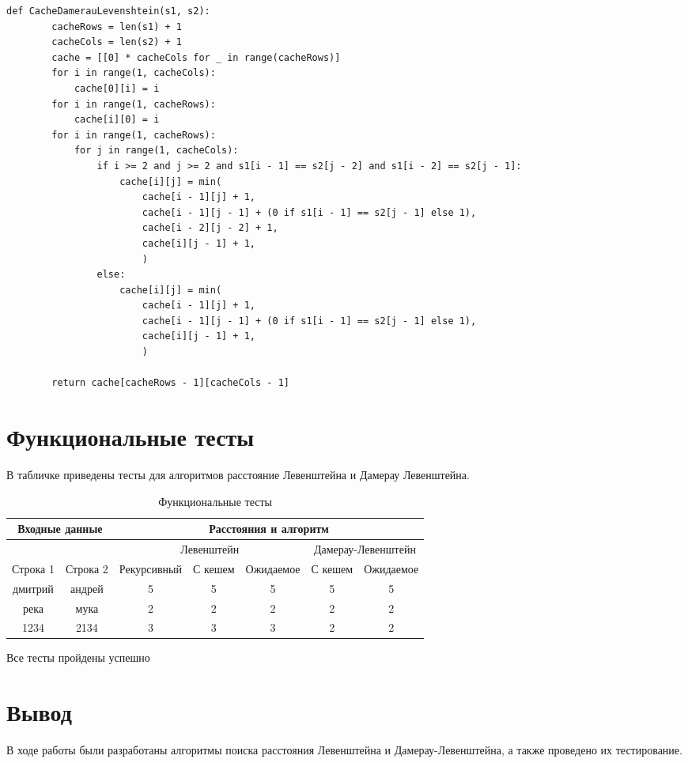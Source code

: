 \begin{lstlisting}[label=cache-damerau-levenshtein,caption={Итерационный алгоритм нахождения расстояния Дамерау-Левенштейна с кешэм}]
	def CacheDamerauLevenshtein(s1, s2):
		cacheRows = len(s1) + 1
		cacheCols = len(s2) + 1
		cache = [[0] * cacheCols for _ in range(cacheRows)]
		for i in range(1, cacheCols):
			cache[0][i] = i
		for i in range(1, cacheRows):
			cache[i][0] = i
		for i in range(1, cacheRows):
			for j in range(1, cacheCols):
				if i >= 2 and j >= 2 and s1[i - 1] == s2[j - 2] and s1[i - 2] == s2[j - 1]:
					cache[i][j] = min(
						cache[i - 1][j] + 1,
						cache[i - 1][j - 1] + (0 if s1[i - 1] == s2[j - 1] else 1),
						cache[i - 2][j - 2] + 1,
						cache[i][j - 1] + 1,
						)
				else:
					cache[i][j] = min(
						cache[i - 1][j] + 1,
						cache[i - 1][j - 1] + (0 if s1[i - 1] == s2[j - 1] else 1),
						cache[i][j - 1] + 1,
						)
		
		return cache[cacheRows - 1][cacheCols - 1]
\end{lstlisting}

\section{Функциональные тесты}

В табличке приведены тесты для алгоритмов расстояние Левенштейна и Дамерау Левенштейна.

\begin{table}[ht]
	\small
	\begin{center}
		\begin{threeparttable}
			\caption{Функциональные тесты}
			\label{tbl:func_tests}
			\begin{tabular}{|c|c|c|c|c|c|c|}
				\hline
				\multicolumn{2}{|c|}{\bfseries Входные данные}
				& \multicolumn{5}{c|}{\bfseries Расстояния и алгоритм} \\ 
				\hline
				&
				&
				\multicolumn{3}{c|}{Левенштейн} & \multicolumn{2}{c|}{Дамерау-Левенштейн} \\ \cline{3-7}
				Строка 1 & Строка 2 & Рекурсивный & С кешем &  Ожидаемое & С кешем & Ожидаемое \\
				\hline
				дмитрий & андрей & 5 & 5 & 5 & 5 & 5 \\
				\hline
				река & мука & 2 & 2 & 2 & 2 & 2 \\
				\hline
				1234 & 2134 & 3 & 3 & 3 & 2 & 2 \\
				\hline
			\end{tabular}	
		\end{threeparttable}
	\end{center}
\end{table}

Все тесты пройдены успешно

\section*{Вывод}

В ходе работы были разработаны алгоритмы поиска расстояния Левенштейна и Дамерау-Левенштейна, а также проведено их тестирование.

\clearpage
